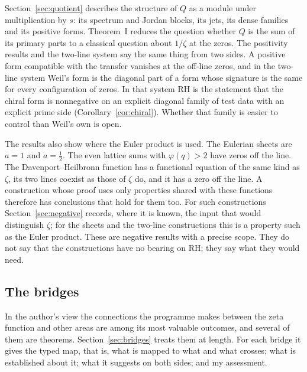 Section~\ref{sec:quotient} describes the structure of $Q$ as a module under multiplication by $s$: its spectrum and Jordan blocks, its jets, its dense families and its positive forms. Theorem~I reduces the question whether $Q$ is the sum of its primary parts to a classical question about $1/\zeta$ at the zeros.
The positivity results and the two-line system say the same thing from two sides. A positive form compatible with the transfer vanishes at the off-line zeros, and in the two-line system Weil's form is the diagonal part of a form whose signature is the same for every configuration of zeros. In that system RH is the statement that the chiral form is nonnegative on an explicit diagonal family of test data with an explicit prime side (Corollary~\ref{cor:chiral}). Whether that family is easier to control than Weil's own is open.

The results also show where the Euler product is used. The Eulerian sheets are $a=1$ and $a=\tfrac12$. The even lattice sums with $\varphi(q)>2$ have zeros off the line. The Davenport--Heilbronn function has a functional equation of the same kind as $\zeta$, its two lines coexist as those of $\zeta$ do, and it has a zero off the line. A construction whose proof uses only properties shared with these functions therefore has conclusions that hold for them too. For such constructions Section~\ref{sec:negative} records, where it is known, the input that would distinguish $\zeta$; for the sheets and the two-line constructions this is a property such as the Euler product. These are negative results with a precise scope. They do not say that the constructions have no bearing on RH; they say what they would need.

\subsection*{The bridges}

In the author's view the connections the programme makes between the zeta function and other areas are among its most valuable outcomes, and several of them are theorems. Section~\ref{sec:bridges} treats them at length. For each bridge it gives the typed map, that is, what is mapped to what and what crosses; what is established about it; what it suggests on both sides; and my assessment.

